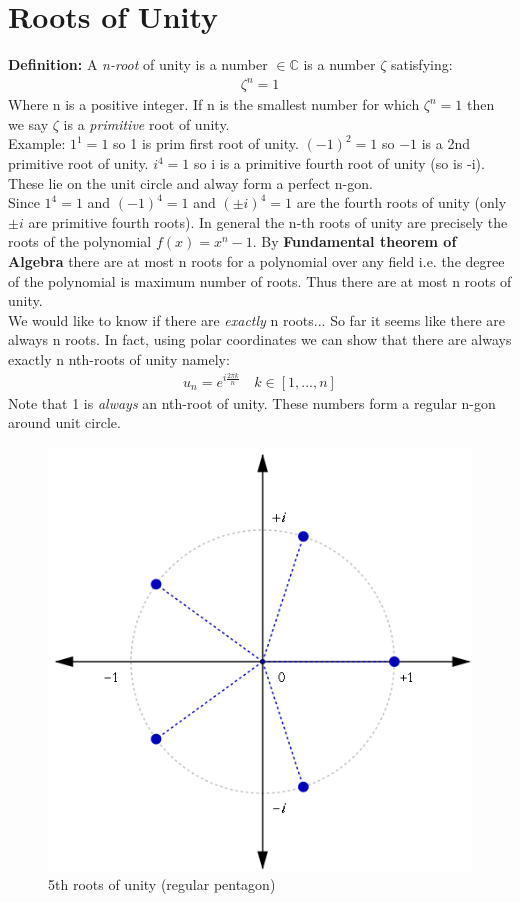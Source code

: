 \documentclass[a4paper, 11pt]{article}
\begin{document}
\section*{Roots of Unity} 
\textbf{Definition:} A \textit{n-root} of unity is a number $\in\mathbb{C}$ is a number $\zeta$ satisfying:
	\begin{align*}
		\zeta^n = 1
	\end{align*}
\noindent Where n is a positive integer. If n is the smallest number for which $\zeta^n=1$ then we say $\zeta$ is a \textit{primitive} root of unity. \\

\noindent Example: $1^1 = 1$ so 1 is prim first root of unity. $(-1)^2 = 1$ so $-1$ is a 2nd primitive root of unity. $i^4 = 1$ so i is a primitive fourth root of unity (so is -i). These lie on the unit circle and alway form a perfect n-gon. \\

\noindent Since $1^4 = 1$ and $(-1)^4=1$ and $(\pm i)^4 = 1$ are the fourth roots of unity (only $\pm i$ are primitive fourth roots). In general the n-th roots of unity are precisely the roots of the polynomial $f(x) = x^n -1$. By \textbf{Fundamental theorem of Algebra} there are at most n roots for a polynomial over any field i.e. the degree of the polynomial is maximum number of roots. Thus there are at most n roots of unity.\\

\noindent We would like to know if there are \textit{exactly} n roots... So far it seems like there are always n roots. In fact, using polar coordinates we can show that there are always exactly n nth-roots of unity namely:
	\begin{eqnarray}
		u_n=e^{i\frac{2\pi k}{n}} \quad k\in[1, ... , n] 
	\end{eqnarray}
\noindent Note that 1 is \textit{always} an nth-root of unity. These numbers form a regular n-gon around unit circle. 
	\begin{figure}[!hbt]
		\centering
		\includegraphics[width=0.4\columnwidth]{rootsOfUnity}
		\caption{5th roots of unity (regular pentagon)}
	\end{figure}
\end{document}
